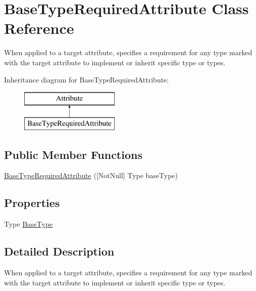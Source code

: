 \hypertarget{class_base_type_required_attribute}{}\section{Base\+Type\+Required\+Attribute Class Reference}
\label{class_base_type_required_attribute}


When applied to a target attribute, specifies a requirement for any type marked with the target attribute to implement or inherit specific type or types.  


Inheritance diagram for Base\+Type\+Required\+Attribute\+:\begin{figure}[H]
\begin{center}
\leavevmode
\includegraphics[height=2.000000cm]{class_base_type_required_attribute}
\end{center}
\end{figure}
\subsection*{Public Member Functions}
\begin{DoxyCompactItemize}
\item 
\mbox{\hyperlink{class_base_type_required_attribute_a3b535405fd33291328613b6ede4e5d8a}{Base\+Type\+Required\+Attribute}} (\mbox{[}Not\+Null\mbox{]} Type base\+Type)
\end{DoxyCompactItemize}
\subsection*{Properties}
\begin{DoxyCompactItemize}
\item 
Type \mbox{\hyperlink{class_base_type_required_attribute_abd32451b36cd8eff34ecee4718e78f5b}{Base\+Type}}
\end{DoxyCompactItemize}


\subsection{Detailed Description}
When applied to a target attribute, specifies a requirement for any type marked with the target attribute to implement or inherit specific type or types. 


